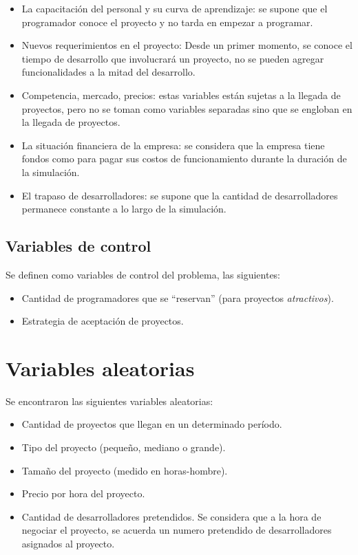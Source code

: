 \begin{itemize}
    \item La capacitación del personal y su curva de aprendizaje: se supone que el programador conoce el proyecto y no tarda en empezar a programar.
    \item Nuevos requerimientos en el proyecto: Desde un primer momento, se conoce el tiempo de desarrollo que involucrará un proyecto, no se pueden agregar 
            funcionalidades a la mitad del desarrollo.
    \item Competencia, mercado, precios: estas variables están sujetas a la llegada de proyectos, pero no se toman como variables separadas sino que se engloban en la 
        llegada de proyectos.
    \item La situación financiera de la empresa: se considera que la empresa tiene fondos como para pagar sus costos de funcionamiento durante la duración de la simulación.
    \item El trapaso de desarrolladores: se supone que la cantidad de desarrolladores permanece constante a lo largo de la simulación.
\end{itemize}

\subsection{Variables de control}
Se definen como variables de control del problema, las siguientes:

\begin{itemize}
    \item Cantidad de programadores que se ``reservan'' (para proyectos \textit{atractivos}).
    \item Estrategia de aceptación de proyectos.
\end{itemize}

\section{Variables aleatorias}
Se encontraron las siguientes variables aleatorias:

\begin{itemize}
    \item Cantidad de proyectos que llegan en un determinado período.
    \item Tipo del proyecto (pequeño, mediano o grande).
    \item Tamaño del proyecto (medido en horas-hombre).
    \item Precio por hora del proyecto.
    \item Cantidad de desarrolladores pretendidos. Se considera que a la hora de negociar el proyecto, se acuerda un numero pretendido de desarrolladores asignados al proyecto.
\end{itemize}

